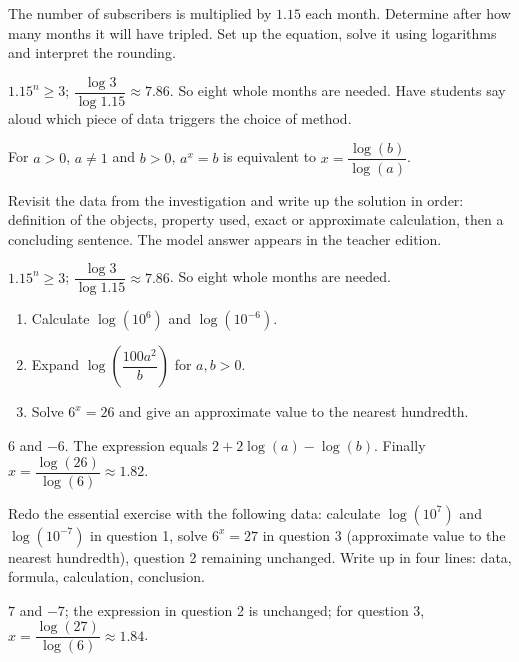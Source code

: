 \begin{activity}
The number of subscribers is multiplied by $\num{1,15}$ each month. Determine after how many months it will have tripled. Set up the equation, solve it using logarithms and interpret the rounding.

\end{activity}
\begin{solution}$\num{1,15}^n\geq3$; $\dfrac{\log3}{\log\num{1,15}}\approx\num{7,86}$. So eight whole months are needed. Have students say aloud which piece of data triggers the choice of method.\end{solution}

\begin{summary}For $a>0$, $a\neq1$ and $b>0$, $a^x=b$ is equivalent to $x=\dfrac{\log(b)}{\log(a)}$.\end{summary}

\begin{example}
Revisit the data from the investigation and write up the solution in order: definition of the objects, property used, exact or approximate calculation, then a concluding sentence. The model answer appears in the teacher edition.
\end{example}
\begin{solution}$\num{1,15}^n\geq3$; $\dfrac{\log3}{\log\num{1,15}}\approx\num{7,86}$. So eight whole months are needed.\end{solution}

\begin{exercise}[essential]
\begin{enumerate}\item Calculate $\log(10^6)$ and $\log(10^{-6})$.\item Expand $\log\!\left(\dfrac{100a^2}{b}\right)$ for $a,b>0$.\item Solve $6^x=26$ and give an approximate value to the nearest hundredth.\end{enumerate}
\end{exercise}
\begin{solution}$6$ and $-6$. The expression equals $2+2\log(a)-\log(b)$. Finally $x=\dfrac{\log(26)}{\log(6)}\approx\num{1,82}$.\end{solution}


\begin{homework}Redo the essential exercise with the following data: calculate $\log(10^{7})$ and $\log(10^{-7})$ in question 1, solve $6^x=27$ in question 3 (approximate value to the nearest hundredth), question 2 remaining unchanged. Write up in four lines: data, formula, calculation, conclusion.\end{homework}
\begin{solution}$7$ and $-7$; the expression in question 2 is unchanged; for question 3, $x=\dfrac{\log(27)}{\log(6)}\approx\num{1,84}$.\end{solution}

